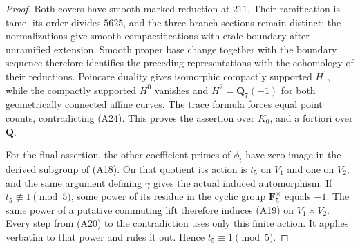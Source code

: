 \begin{proof}
Both covers have smooth marked reduction at $211$.
Their ramification is tame, its order divides $5625$,
and the three branch sections remain distinct; the
normalizations give smooth compactifications with etale
boundary after unramified extension. Smooth proper base
change together with the boundary sequence therefore
identifies the preceding representations with the
cohomology of their reductions. Poincare duality gives
isomorphic compactly supported $H^1$, while the compactly
supported $H^0$ vanishes and $H^2=\mathbf Q_7(-1)$ for
both geometrically connected affine curves. The trace
formula forces equal point counts, contradicting (A24).
This proves the assertion over $K_0$, and a fortiori
over $\mathbf Q$.

For the final assertion, the other coefficient primes of
$\phi_t$ have zero image in the derived subgroup of (A18).
On that quotient its action is $t_5$ on $V_1$ and one on
$V_2$, and the same argument defining $\gamma$ gives the
actual induced automorphism. If $t_5\not\equiv1\pmod5$,
some power of its residue in the cyclic group
$\mathbf F_5^\times$ equals $-1$. The same power of a
putative commuting lift therefore induces (A19) on
$V_1\times V_2$. Every step from (A20) to the contradiction
uses only this finite action. It applies verbatim to that
power and rules it out. Hence $t_5\equiv1\pmod5$.
\end{proof}


